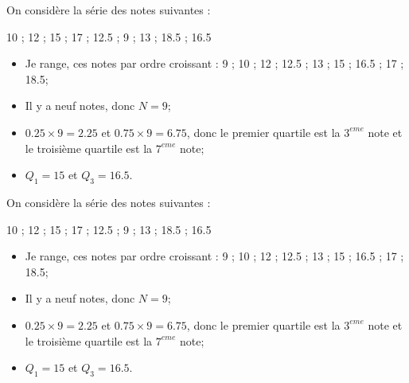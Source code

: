 \documentclass[12pt,a4paper]{article}
\begin{document}
\begin{myex}
	On considère la série des notes suivantes : 
	
	\num{10} ; \num{12} ; \num{15} ; \num{17} ; \num{12.5} ; \num{9} ; \num{13} ; \num{18.5} ; \num{16.5}
	
	\begin{itemize}
		\item Je range, ces notes par ordre croissant :
		\num{9} ; \num{10} ; \num{12} ; \num{12.5} ; \num{13} ; \num{15} ; \num{16.5} ; \num{17} ; \num{18.5};
		
		\item Il y a neuf notes, donc $N = 9$;
		\item $\num{0.25} \times 9 = \num{2.25}$ et $\num{0.75} \times 9 = \num{6.75}$, donc le premier quartile est la $3^{eme}$ note et le troisième quartile est la $7^{eme}$ note;
		\item $Q_1 = 15$ et $Q_3 = \num{16.5}$.
	\end{itemize}
	
	
\end{myex}


\begin{myex}
	On considère la série des notes suivantes : 
	
	\num{10} ; \num{12} ; \num{15} ; \num{17} ; \num{12.5} ; \num{9} ; \num{13} ; \num{18.5} ; \num{16.5}
	
	\begin{itemize}
		\item Je range, ces notes par ordre croissant :
		\num{9} ; \num{10} ; \num{12} ; \num{12.5} ; \num{13} ; \num{15} ; \num{16.5} ; \num{17} ; \num{18.5};
		
		\item Il y a neuf notes, donc $N = 9$;
		\item $\num{0.25} \times 9 = \num{2.25}$ et $\num{0.75} \times 9 = \num{6.75}$, donc le premier quartile est la $3^{eme}$ note et le troisième quartile est la $7^{eme}$ note;
		\item $Q_1 = 15$ et $Q_3 = \num{16.5}$.
	\end{itemize}
	
	
\end{myex}
\end{document}
